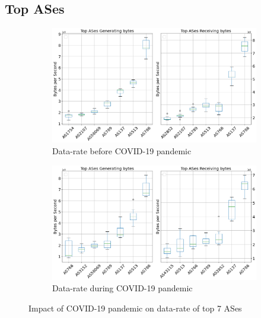 \documentclass[10pt, journal, letterpaper]{IEEEtran}
\begin{document}
\subsection{Top ASes}
\begin{figure}[hbt!]
    \centering
    \begin{subfigure}{\columnwidth}
          \centering
          \includegraphics[width=\columnwidth]{img/OWBCO_top7ASes_bps.png}
          \caption{Data-rate before COVID-19 pandemic}
          \label{fig:OWBCO_topAS_bps}
    \end{subfigure}
    \begin{subfigure}{\columnwidth}
          \centering
          \includegraphics[width=\columnwidth]{img/CO2_top7ASes_bps.png}
          \caption{Data-rate during COVID-19 pandemic}
          \label{fig:CO_topAS_bps}
    \end{subfigure}
    \caption{Impact of COVID-19 pandemic on data-rate of top 7 ASes}
    \label{fig:topAS_bps_OW_CO}
\end{figure}
\end{document}
